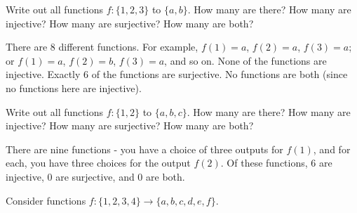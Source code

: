 \begin{questions}
\question Write out all functions $f: \{1,2,3\}$ to $\{a,b\}$.  How many are there?  How many are injective?  How many are surjective?  How many are both?

	\begin{answer}
	There are 8 different functions.  For example, $f(1) = a$, $f(2) = a$, $f(3) = a$; or $f(1) = a$, $f(2) = b$, $f(3) = a$, and so on.  None of the functions are injective.  Exactly 6 of the functions are surjective.  No functions are both (since no functions here are injective).
	\end{answer}
	
	
	

\question Write out all functions $f: \{1,2\}$ to $\{a,b,c\}$.  How many are there?  How many are injective?  How many are surjective?  How many are both?

	\begin{answer}
	There are nine functions - you have a choice of three outputs for $f(1)$, and for each, you have three choices for the output $f(2)$.  Of these functions, 6 are injective, 0 are surjective, and 0 are both.
	\end{answer}
	
	

	


\question Consider functions $f: \{1,2,3,4\} \to \{a,b,c,d,e,f\}$.

	\begin{answer}
\end{answer}
\end{questions}
